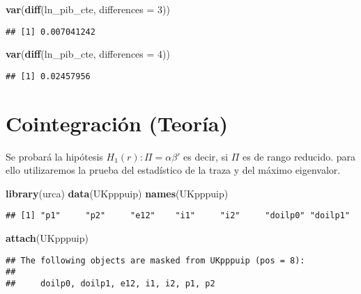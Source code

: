 \documentclass[]{book}
\newenvironment{Shaded}{\begin{snugshade}}{\end{snugshade}}
\newcommand{\KeywordTok}[1]{\textcolor[rgb]{0.13,0.29,0.53}{\textbf{#1}}}
\newcommand{\DataTypeTok}[1]{\textcolor[rgb]{0.13,0.29,0.53}{#1}}
\newcommand{\DecValTok}[1]{\textcolor[rgb]{0.00,0.00,0.81}{#1}}
\newcommand{\NormalTok}[1]{#1}
\theoremstyle{definition}
\theoremstyle{definition}
\theoremstyle{definition}
\theoremstyle{remark}
\begin{document}
\begin{Shaded}
\begin{Highlighting}[]
\KeywordTok{var}\NormalTok{(}\KeywordTok{diff}\NormalTok{(ln_pib_cte, }\DataTypeTok{differences =} \DecValTok{3}\NormalTok{))}
\end{Highlighting}
\end{Shaded}

\begin{verbatim}
## [1] 0.007041242
\end{verbatim}

\begin{Shaded}
\begin{Highlighting}[]
\KeywordTok{var}\NormalTok{(}\KeywordTok{diff}\NormalTok{(ln_pib_cte, }\DataTypeTok{differences =} \DecValTok{4}\NormalTok{))}
\end{Highlighting}
\end{Shaded}

\begin{verbatim}
## [1] 0.02457956
\end{verbatim}

\chapter{Cointegración (Teoría)}\label{cointegracion-teoria}

Se probará la hipótesis \(H_1(r) : \Pi =\alpha\beta'\) es decir, si
\(\Pi\) es de rango reducido. para ello utilizaremos la prueba del
estadístico de la traza y del máximo eigenvalor.

\begin{Shaded}
\begin{Highlighting}[]
\KeywordTok{library}\NormalTok{(urca)}
\KeywordTok{data}\NormalTok{(UKpppuip)}
\KeywordTok{names}\NormalTok{(UKpppuip)}
\end{Highlighting}
\end{Shaded}

\begin{verbatim}
## [1] "p1"     "p2"     "e12"    "i1"     "i2"     "doilp0" "doilp1"
\end{verbatim}

\begin{Shaded}
\begin{Highlighting}[]
\KeywordTok{attach}\NormalTok{(UKpppuip)}
\end{Highlighting}
\end{Shaded}

\begin{verbatim}
## The following objects are masked from UKpppuip (pos = 8):
## 
##     doilp0, doilp1, e12, i1, i2, p1, p2
\end{verbatim}
\end{document}
